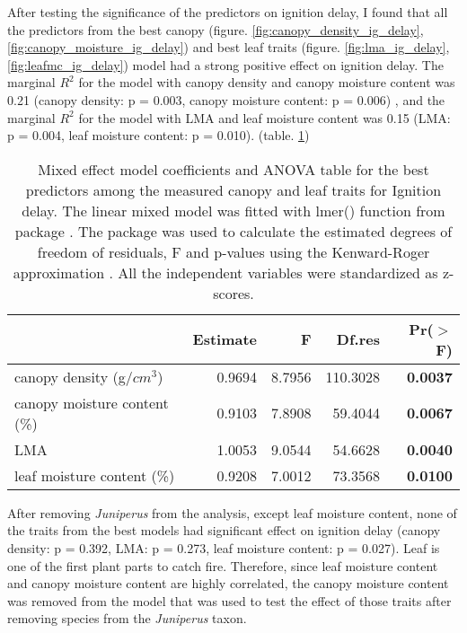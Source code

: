 \documentclass[12pt]{report}
\begin{document}
After testing the significance of the predictors on ignition delay, I found that all the predictors from the best canopy (figure. \ref{fig:canopy_density_ig_delay}, \ref{fig:canopy_moisture_ig_delay}) and best leaf traits (figure. \ref{fig:lma_ig_delay}, \ref{fig:leafmc_ig_delay}) model had a strong positive effect on ignition delay. The marginal $R^2$ for the model with canopy density and canopy moisture content was 0.21 (canopy density: p = 0.003, canopy moisture content: p = 0.006) , and the marginal $R^2$ for the model with LMA and leaf moisture content was 0.15 (LMA: p = 0.004, leaf moisture content: p = 0.010). (table. \ref{tab:fandpforig_delay})

\begin{table}[ht]
\centering
\caption{Mixed effect model coefficients and ANOVA table for the best predictors among the measured canopy and leaf traits for Ignition delay. The linear mixed model was fitted with lmer() function from  package \citep{bates2009package}. The  package \citep{fox2013hypothesis} was used to calculate the estimated degrees of freedom of residuals, F and p-values using the Kenward-Roger approximation \citep{kenward1997small}. All the independent variables were standardized  as z-scores.}
\vspace{0.2\,cm}
\begin{tabular}{lrrrr}
  \hline
 & Estimate & F & Df.res & Pr($>$F) \\ 
  \hline 
  canopy density (g/{$cm^3$}) & 0.9694 & 8.7956  & 110.3028 & \textbf{0.0037} \\ 
  canopy moisture content (\%) & 0.9103 & 7.8908 & 59.4044 & \textbf{0.0067} \\ 
  LMA & 1.0053 & 9.0544  & 54.6628 & \textbf{0.0040} \\  
  leaf moisture content (\%) & 0.9208 & 7.0012  & 73.3568 & \textbf{0.0100} \\ 
  \hline
\end{tabular}
\label{tab:fandpforig_delay}
\end{table}

After removing \emph{Juniperus} from the analysis, except leaf moisture content, none of the traits from the best models had significant effect on ignition delay (canopy density: p = 0.392,
LMA: p = 0.273, leaf moisture content: p = 0.027). Leaf is one of the first plant parts to catch fire.
Therefore, since leaf moisture content and canopy moisture content are highly correlated, the canopy moisture content was removed from the model that was used to test the effect of those traits after removing species from the \emph{Juniperus} taxon.
\end{document}
